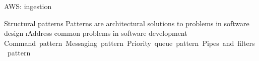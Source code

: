 













{
\begin{frame}{AWS: ingestion}
    
\end{frame}
}





\begin{frame}{Structural patterns}
Patterns are architectural solutions to problems in software design
\i Address common problems in software development
\si Command pattern
\si Messaging pattern
\si Priority queue pattern
\si Pipes and filters pattern
\end{frame}

